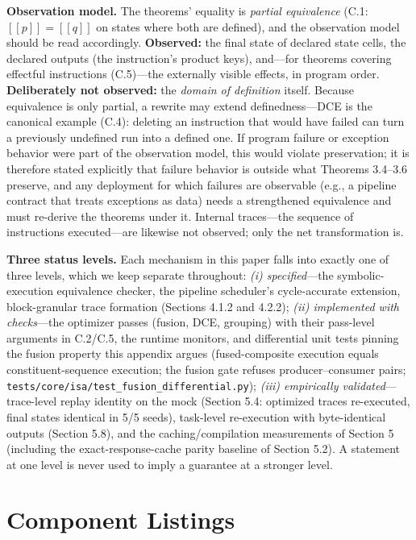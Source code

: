 \documentclass[
  11pt,
]{article}
\newcommand{\llbracket}{[\![}
\newcommand{\rrbracket}{]\!]}
\begin{document}
\textbf{Observation model.} The theorems' equality is \emph{partial
equivalence} (C.1: \(\llbracket p \rrbracket = \llbracket q \rrbracket\)
on states where both are defined), and the observation model should be
read accordingly. \textbf{Observed:} the final state of declared state
cells, the declared outputs (the instruction's product keys), and---for
theorems covering effectful instructions (C.5)---the externally visible
effects, in program order. \textbf{Deliberately not observed:} the
\emph{domain of definition} itself. Because equivalence is only partial,
a rewrite may extend definedness---DCE is the canonical example (C.4):
deleting an instruction that would have failed can turn a previously
undefined run into a defined one. If program failure or exception
behavior were part of the observation model, this would violate
preservation; it is therefore stated explicitly that failure behavior is
outside what Theorems 3.4--3.6 preserve, and any deployment for which
failures are observable (e.g., a pipeline contract that treats
exceptions as data) needs a strengthened equivalence and must re-derive
the theorems under it. Internal traces---the sequence of instructions
executed---are likewise not observed; only the net transformation is.

\textbf{Three status levels.} Each mechanism in this paper falls into
exactly one of three levels, which we keep separate throughout:
\emph{(i) specified}---the symbolic-execution equivalence checker, the
pipeline scheduler's cycle-accurate extension, block-granular trace
formation (Sections 4.1.2 and 4.2.2); \emph{(ii) implemented with
checks}---the optimizer passes (fusion, DCE, grouping) with their
pass-level arguments in C.2/C.5, the runtime monitors, and differential
unit tests pinning the fusion property this appendix argues
(fused-composite execution equals constituent-sequence execution; the
fusion gate refuses producer--consumer pairs;
\texttt{tests/core/isa/test\_fusion\_differential.py}); \emph{(iii)
empirically validated}---trace-level replay identity on the mock
(Section 5.4: optimized traces re-executed, final states identical in
5/5 seeds), task-level re-execution with byte-identical outputs (Section
5.8), and the caching/compilation measurements of Section 5 (including
the exact-response-cache parity baseline of Section 5.2). A statement at
one level is never used to imply a guarantee at a stronger level.

\section{Component Listings}\label{component-listings}
\end{document}
